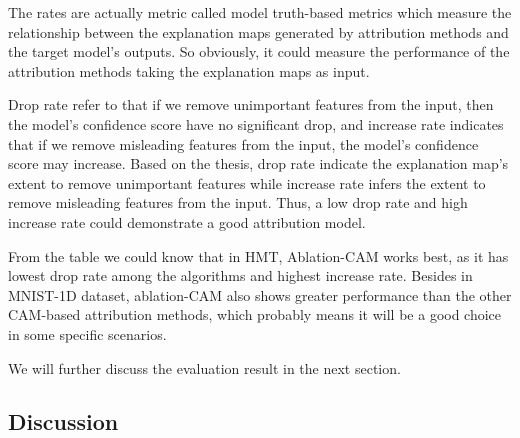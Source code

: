 \documentclass[conference]{IEEEtran}
\begin{document}
The rates are actually metric called model truth-based metrics which measure the relationship between the explanation maps generated by attribution methods and the target model's outputs. So obviously, it could measure the performance of the attribution methods taking the explanation maps as input.\par
Drop rate refer to that if we remove unimportant features from the input, then the model's confidence score have no significant drop, and increase rate indicates that if we remove misleading features from the input, the model's confidence score may increase. Based on the thesis, drop rate indicate the explanation map's extent to remove unimportant features while increase rate infers the extent to remove misleading features from the input. Thus, a low drop rate and high increase rate could demonstrate a good attribution model.\par
From the table we could know that in HMT, Ablation-CAM works best, as it has lowest drop rate among the algorithms and highest increase rate. Besides in MNIST-1D dataset, ablation-CAM also shows greater performance than the other CAM-based attribution methods, which probably means it will be a good choice in some specific scenarios.\par
We will further discuss the evaluation result in the next section.

\subsection{Discussion}
\end{document}
